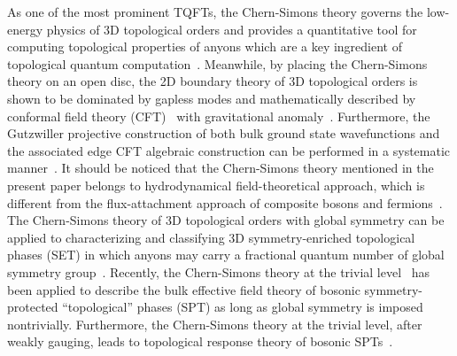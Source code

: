 \documentclass[11pt,nofootinbib,preprint]{revtex4-1}
\begin{document}
As one of the most prominent   TQFTs, the Chern-Simons theory governs the low-energy physics of $3$D topological orders and provides a quantitative tool for computing topological properties of anyons which are a key ingredient of topological quantum computation~\cite{sarma_08_TQC}. Meanwhile, by placing the Chern-Simons theory on an open disc, the 2D boundary theory of 3D topological orders is shown to be dominated by gapless modes and mathematically described by conformal field theory (CFT)~\cite{moore1989classical} with  gravitational anomaly~\cite{Wen_grav_prd2013,string8}.  Furthermore, the Gutzwiller projective construction of both  bulk ground state wavefunctions and the associated edge CFT algebraic construction can be performed in a systematic manner~\cite{Wen99,Barkeshli2010,barkeshli_wen}.  It should be noticed that the Chern-Simons theory mentioned in the present paper belongs to  hydrodynamical field-theoretical approach, which is different from the flux-attachment   approach of composite bosons and fermions~\cite{composite_Jain_2,composite_Fradkin,PhysRevLett.62.82}. The Chern-Simons theory of 3D topological orders with global symmetry can be applied to characterizing and classifying 3D symmetry-enriched topological phases (SET) in which anyons may carry a fractional quantum number of global symmetry group~\cite{PhysRevB.93.155121,PhysRevB.87.195103}. Recently, the Chern-Simons theory at the trivial level~\cite{PhysRevB.86.125119,YW12,PhysRevB.93.115136,Ye14b}  has been   applied to describe the bulk effective field theory of bosonic symmetry-protected ``topological'' phases (SPT) as long as global symmetry is imposed nontrivially. Furthermore, the Chern-Simons theory at the trivial level, after weakly gauging, leads to   topological response theory of bosonic SPTs~\cite{PhysRevLett.112.141602,Hung_Wen_gauge}.  
\end{document}
